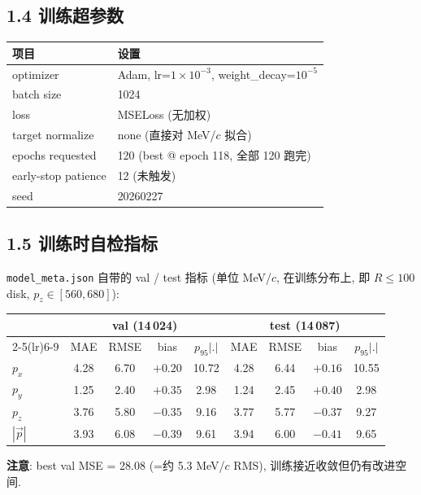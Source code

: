 \documentclass[a4paper,11pt]{article}
\begin{document}
\subsection{1.4 训练超参数}

\begin{table}[H]
\centering\footnotesize
\begin{tabular}{ll}
\toprule
项目 & 设置 \\
\midrule
optimizer        & Adam, lr=$1\!\times\!10^{-3}$, weight\_decay=$10^{-5}$ \\
batch size       & 1024 \\
loss             & MSELoss (无加权) \\
target normalize & none (直接对 MeV/$c$ 拟合) \\
epochs requested & 120 (best @ epoch 118, 全部 120 跑完) \\
early-stop patience & 12 (未触发) \\
seed             & 20260227 \\
\bottomrule
\end{tabular}
\end{table}

\subsection{1.5 训练时自检指标}
\texttt{model\_meta.json} 自带的 val / test 指标 (单位 MeV/$c$, 在训练分布上, 即 $R\le 100$ disk, $p_z\in[560,680]$):

\begin{table}[H]
\centering\footnotesize
\begin{tabular}{lcccccccc}
\toprule
        & \multicolumn{4}{c}{val (14\,024)}     & \multicolumn{4}{c}{test (14\,087)} \\
\cmidrule(lr){2-5}\cmidrule(lr){6-9}
        & MAE & RMSE & bias & $p_{95}|.|$       & MAE & RMSE & bias & $p_{95}|.|$ \\
\midrule
$p_x$   & 4.28 & 6.70 & $+0.20$ & 10.72         & 4.28 & 6.44 & $+0.16$ & 10.55 \\
$p_y$   & 1.25 & 2.40 & $+0.35$ &  2.98         & 1.24 & 2.45 & $+0.40$ &  2.98 \\
$p_z$   & 3.76 & 5.80 & $-0.35$ &  9.16         & 3.77 & 5.77 & $-0.37$ &  9.27 \\
$|\vec p|$ & 3.93 & 6.08 & $-0.39$ & 9.61       & 3.94 & 6.00 & $-0.41$ &  9.65 \\
\bottomrule
\end{tabular}
\end{table}
\textbf{注意}: best val MSE = 28.08 (=约 5.3 MeV/$c$ RMS), 训练接近收敛但仍有改进空间.
\end{document}
